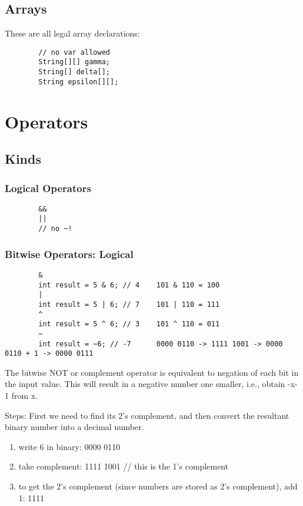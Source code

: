 \documentclass{scrartcl}
\begin{document}
\subsection{Arrays}

    These are all legal array declarations:

    \begin{lstlisting}
        // no var allowed
        String[][] gamma;
        String[] delta[];
        String epsilon[][];
    \end{lstlisting}

\section{Operators}
\subsection{Kinds}
\subsubsection{Logical Operators}
    \begin{lstlisting}
        &&
        ||
        // no ~!
    \end{lstlisting}

\subsubsection{Bitwise Operators: Logical}
    \begin{lstlisting}
        &
        int result = 5 & 6; // 4    101 & 110 = 100
        |
        int result = 5 | 6; // 7    101 | 110 = 111
        ^
        int result = 5 ^ 6; // 3    101 ^ 110 = 011
        ~
        int result = ~6; // -7      0000 0110 -> 1111 1001 -> 0000 0110 + 1 -> 0000 0111
    \end{lstlisting}

    The bitwise NOT or complement operator is equivalent to negation of each bit in the input value. This will result in a negative number one smaller, i.e., obtain -x-1 from x.

    Steps: First we need to find its 2’s complement, and then convert the resultant binary number into a decimal number.

    \begin{enumerate}
        \item write 6 in binary: 0000 0110
        \item take complement: 1111 1001 // this is the 1's complement
        \item to get the 2's complement (since numbers are stored as 2’s complement), add 1: 1111
    \end{enumerate}
\end{document}
